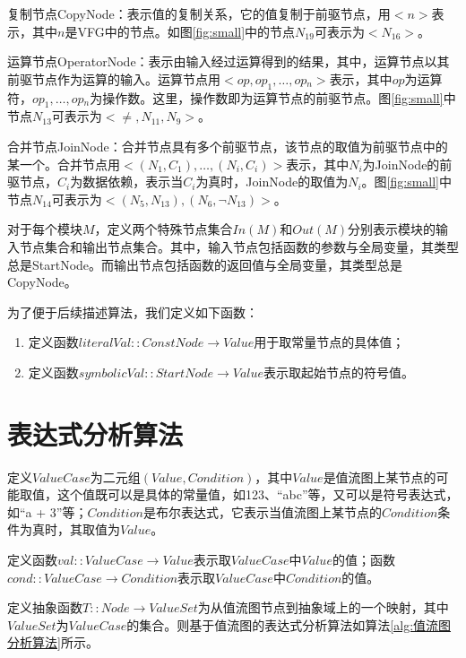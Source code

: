 复制节点CopyNode：表示值的复制关系，它的值复制于前驱节点，用$ <n> $表示，其中$ n $是VFG中的节点。如图\ref{fig:small}中的节点$ N_{19} $可表示为$ <N_{16}> $。

运算节点OperatorNode：表示由输入经过运算得到的结果，其中，运算节点以其前驱节点作为运算的输入。运算节点用$ <op, op_1, …, op­_n> $表示，其中$ op $为运算符，$ op_1, …, op­_n $为操作数。这里，操作数即为运算节点的前驱节点。图\ref{fig:small}中节点$ N_{13} $可表示为$ <≠, N_{11}, N_{9}> $。

合并节点JoinNode：合并节点具有多个前驱节点，该节点的取值为前驱节点中的某一个。合并节点用$ <(N_1, C_1), …, (N_i, C_i)> $表示，其中$ N_i $为JoinNode的前驱节点，$ C_i $为数据依赖，表示当$ C_i $为真时，JoinNode的取值为$ N_i $。图\ref{fig:small}中节点$ N_{14} $可表示为$ <(N_5, N_{13}), (N_6, ¬N_{13})> $。

对于每个模块$ M $，定义两个特殊节点集合$ In(M) $和$ Out(M) $分别表示模块的输入节点集合和输出节点集合。其中，输入节点包括函数的参数与全局变量，其类型总是StartNode。而输出节点包括函数的返回值与全局变量，其类型总是CopyNode。

为了便于后续描述算法，我们定义如下函数：
\begin{enumerate}
	\item 定义函数$ literalVal::ConstNode \rightarrow Value $用于取常量节点的具体值；
	\item 定义函数$ symbolicVal::StartNode \rightarrow Value $表示取起始节点的符号值。
\end{enumerate}

\section{表达式分析算法}

定义$ ValueCase $为二元组$  (Value, Condition) $，其中$ Value $是值流图上某节点的可能取值，这个值既可以是具体的常量值，如123、“abc”等，又可以是符号表达式，如“a + 3”等；$ Condition $是布尔表达式，它表示当值流图上某节点的$ Condition $条件为真时，其取值为$ Value $。

定义函数$ val::ValueCase \rightarrow Value $表示取$ ValueCase $中$ Value $的值；函数$ cond::ValueCase \rightarrow Condition $表示取$ ValueCase $中$ Condition $的值。

定义抽象函数$ T::Node \rightarrow ValueSet $为从值流图节点到抽象域上的一个映射，其中$ ValueSet $为$ ValueCase $的集合。则基于值流图的表达式分析算法如算法\ref{alg:值流图分析算法}所示。

